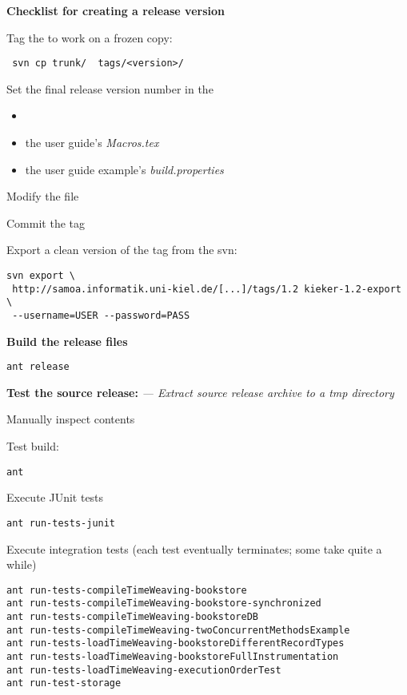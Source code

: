 \textbf{Checklist for creating a release version}

\begin{compactenum}
\item Tag the  to work on a frozen copy:
\setBashListing
\begin{lstlisting}
 svn cp trunk/  tags/<version>/
\end{lstlisting}
\item Set the final release version number in the
\begin{itemize}
\item {}
\item the user guide's \textit{Macros.tex}
\item the user guide example's \textit{build.properties}
\end{itemize}
\item Modify the  file
\item Commit the tag
\item Export a clean version of the tag from the svn:
\setBashListing
\begin{lstlisting}
svn export \
 http://samoa.informatik.uni-kiel.de/[...]/tags/1.2 kieker-1.2-export \
 --username=USER --password=PASS
\end{lstlisting}
\item \textbf{Build the release files}
\setBashListing
\begin{lstlisting}
ant release
\end{lstlisting}
\item \textbf{Test the source release:} \textit{--- Extract source release archive to a tmp directory}
\begin{compactenum}
\item Manually inspect contents
\item Test build:
\setBashListing
\begin{lstlisting}
ant
\end{lstlisting}
\item Execute JUnit tests
\setBashListing
\begin{lstlisting}
ant run-tests-junit
\end{lstlisting}
\item Execute integration tests (each test eventually terminates; some take quite a while)
\setBashListing
\begin{lstlisting}
ant run-tests-compileTimeWeaving-bookstore
ant run-tests-compileTimeWeaving-bookstore-synchronized
ant run-tests-compileTimeWeaving-bookstoreDB
ant run-tests-compileTimeWeaving-twoConcurrentMethodsExample
ant run-tests-loadTimeWeaving-bookstoreDifferentRecordTypes
ant run-tests-loadTimeWeaving-bookstoreFullInstrumentation
ant run-tests-loadTimeWeaving-executionOrderTest
ant run-test-storage
\end{lstlisting}
\end{compactenum}


\end{compactenum}
